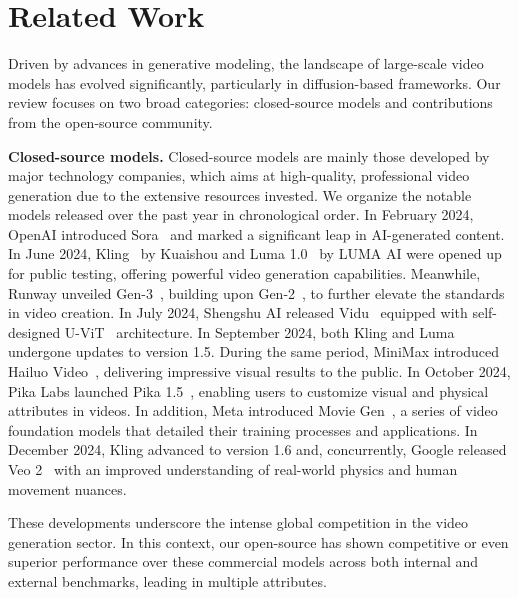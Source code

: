 \section{Related Work}
\label{sec:related-work}

Driven by advances in generative modeling, the landscape of large-scale video models has evolved significantly, particularly in diffusion-based frameworks. Our review focuses on two broad categories: closed-source models and contributions from the open-source community.


\textbf{Closed-source models.}
Closed-source models are mainly those developed by major technology companies, which aims at high-quality, professional video generation due to the extensive resources invested. We organize the notable models released over the past year in chronological order.
In February 2024, OpenAI introduced Sora~\citep{openaisora2024} and marked a significant leap in AI-generated content. In June 2024, Kling~\citep{kuaishou2024kling} by Kuaishou and Luma 1.0~\citep{luma2024dm} by LUMA AI were opened up for public testing, offering powerful video generation capabilities. Meanwhile, Runway unveiled Gen-3~\citep{runway2024gen3}, building upon Gen-2~\citep{runway2024gen2}, to further elevate the standards in video creation. In July 2024, Shengshu AI released Vidu~\citep{bao2024vidu} equipped with self-designed U-ViT~\citep{bao2022all} architecture.
In September 2024, both Kling and Luma undergone updates to version 1.5.
During the same period, MiniMax introduced Hailuo Video~\citep{minimax2024hailuo}, delivering impressive visual results to the public. In October 2024, Pika Labs launched Pika 1.5~\citep{pika2024pika}, enabling users to customize visual and physical attributes in videos. In addition, Meta introduced Movie Gen~\citep{polyak2024moviegencastmedia}, a series of video foundation models that detailed their training processes and applications. In December 2024, Kling advanced to version 1.6 and, concurrently, Google released Veo 2~\citep{veo22025} with an improved understanding of real-world physics and human movement nuances.

These developments underscore the intense global competition in the video generation sector. In this context, our open-source \method has shown competitive or even superior performance over these commercial models across both internal and external benchmarks, leading in multiple attributes.

